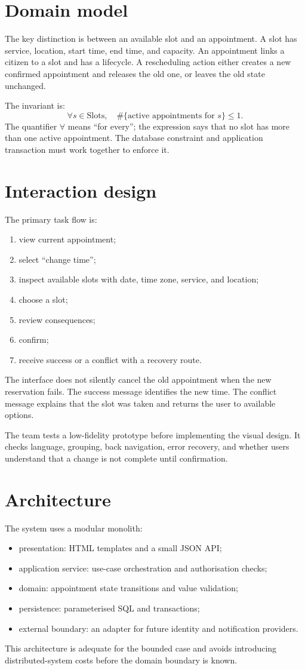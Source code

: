 \section{Domain model}
The key distinction is between an available slot and an appointment. A slot has service, location, start time, end time, and capacity. An appointment links a citizen to a slot and has a lifecycle. A rescheduling action either creates a new confirmed appointment and releases the old one, or leaves the old state unchanged.

The invariant is:
\[
\forall s\in\text{Slots},\quad \#\{\text{active appointments for }s\}\le 1.
\]
The quantifier $\forall$ means \enquote{for every}; the expression says that no slot has more than one active appointment. The database constraint and application transaction must work together to enforce it.

\section{Interaction design}
The primary task flow is:
\begin{enumerate}
\item view current appointment;
\item select \enquote{change time};
\item inspect available slots with date, time zone, service, and location;
\item choose a slot;
\item review consequences;
\item confirm;
\item receive success or a conflict with a recovery route.
\end{enumerate}
The interface does not silently cancel the old appointment when the new reservation fails. The success message identifies the new time. The conflict message explains that the slot was taken and returns the user to available options.

The team tests a low-fidelity prototype before implementing the visual design. It checks language, grouping, back navigation, error recovery, and whether users understand that a change is not complete until confirmation.

\section{Architecture}
The system uses a modular monolith:
\begin{itemize}
\item presentation: HTML templates and a small JSON API;
\item application service: use-case orchestration and authorisation checks;
\item domain: appointment state transitions and value validation;
\item persistence: parameterised SQL and transactions;
\item external boundary: an adapter for future identity and notification providers.
\end{itemize}
This architecture is adequate for the bounded case and avoids introducing distributed-system costs before the domain boundary is known.

